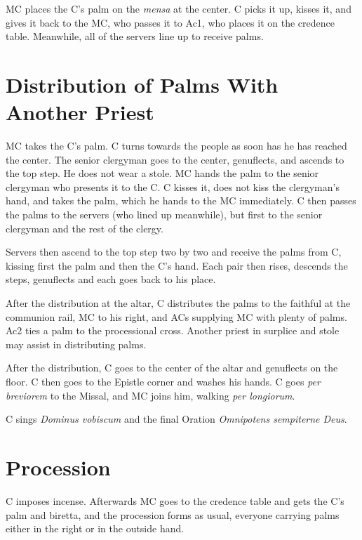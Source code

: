 {    \rubric MC places the C's palm on the \textit{mensa} at the center. C picks
    it up, kisses it, and gives it back to the MC, who passes it to Ac1, who
    places it on the credence table. Meanwhile, all of the servers line up to
    receive palms.

	\section{Distribution of Palms With Another Priest}

	\rubric MC takes the C's palm. C turns towards the people as soon has he
	has reached the center. The senior clergyman goes to the center,
	genuflects, and ascends to the top step. He does not wear a stole. MC hands
	the palm to the senior clergyman who presents it to the C. C kisses it,
	does not kiss the clergyman's hand, and takes the palm, which he hands to
	the MC immediately. C then passes the palms to the servers (who lined up
	meanwhile), but first to the senior clergyman and the rest of the clergy.

	\rubric Servers then ascend to the top step two by two and receive the
	palms from C, kissing first the palm and then the C's hand. Each pair then
	rises, descends the steps, genuflects and each goes back to his place.

	\rubric After the distribution at the altar, C distributes the palms to the
	faithful at the communion rail, MC to his right, and ACs supplying MC with
	plenty of palms. Ac2 ties a palm to the processional cross. Another priest
	in surplice and stole may assist in distributing palms.

	\rubric After the distribution, C goes to the center of the altar and
	genuflects on the floor. C then goes to the Epistle corner and washes his
	hands. C goes \textit{per breviorem} to the Missal, and MC joins him,
	walking \textit{per longiorum}.

	\rubric C sings \textit{Dominus vobiscum} and the final Oration
	\textit{Omnipotens sempiterne Deus}.

	\section{Procession}

	\rubric C imposes incense. Afterwards MC goes to the credence table and
	gets the C's palm and biretta, and the procession forms as usual, everyone
	carrying palms either in the right or in the outside hand.

}
